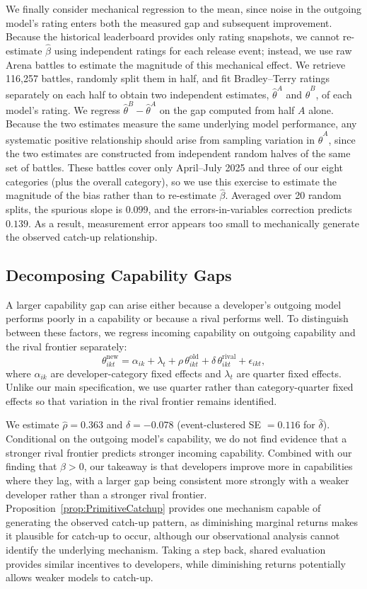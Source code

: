 We finally consider mechanical regression to the mean, since noise in the outgoing model's rating enters both the measured gap and subsequent improvement. 
Because the historical leaderboard provides only rating snapshots, we cannot re-estimate \(\hat{\beta}\) using independent ratings for each release event; instead, we use raw Arena battles to estimate the magnitude of this mechanical effect. 
We retrieve 116,257 battles, randomly split them in half, and fit Bradley--Terry ratings separately on each half to obtain two independent estimates, \(\hat{\theta}^{A}\) and \(\hat{\theta}^{B}\), of each model's rating.
We regress \(\hat{\theta}^{B}-\hat{\theta}^{A}\) on the gap computed from half \(A\) alone. 
Because the two estimates measure the same underlying model performance, any systematic positive relationship should arise from sampling variation in \(\hat\theta^A\), since the two estimates are constructed from independent random halves of the same set of battles.
These battles cover only April--July 2025 and three of our eight categories (plus the overall category), so we use this exercise to estimate the magnitude of the bias rather than to re-estimate \(\hat{\beta}\). 
Averaged over 20 random splits, the spurious slope is \(0.099\), and the errors-in-variables correction predicts $0.139$. 
As a result, measurement error appears too small to mechanically generate the observed catch-up relationship.

\subsection{Decomposing Capability Gaps}
\label{app:strong_competitors}

A larger capability gap can arise either because a developer's outgoing model performs poorly in a capability or because a rival performs well.
To distinguish between these factors, we regress incoming capability on outgoing capability and the rival frontier
separately:
\[
\theta^{\mathrm{new}}_{ikt} = \alpha_{ik}+\lambda_t +\rho\,\theta^{\mathrm{old}}_{ikt} +\delta\,\theta^{\mathrm{rival}}_{ikt} +\epsilon_{ikt},
\]
where $\alpha_{ik}$ are developer-category fixed effects and $\lambda_t$ are quarter fixed effects. 
Unlike our main specification, we use quarter rather than category-quarter fixed effects so that variation in the rival frontier remains identified.

We estimate $\hat\rho=0.363$ and $\hat\delta=-0.078$ (event-clustered SE $=0.116$ for $\hat\delta$). 
Conditional on the outgoing model's capability, we do not find evidence that a stronger rival frontier predicts stronger incoming capability.
Combined with our finding that $\hat{\beta}>0$, our takeaway is that developers improve more in capabilities where they lag, with a larger gap being consistent more strongly with a weaker developer rather than a stronger rival frontier. 
Proposition~\ref{prop:PrimitiveCatchup} provides one mechanism capable of generating the observed catch-up pattern, as diminishing marginal returns makes it plausible for catch-up to occur, although our observational analysis cannot identify the underlying mechanism.
Taking a step back, shared evaluation provides similar incentives to developers, while diminishing returns potentially allows weaker models to catch-up. 
